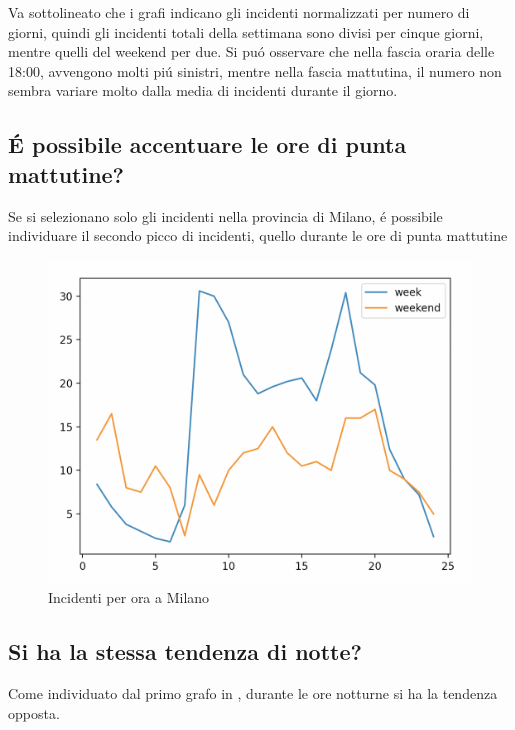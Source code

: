 \documentclass[a4paper]{report}
\begin{document}
Va sottolineato che i grafi indicano gli incidenti normalizzati per numero di 
giorni, 
quindi gli incidenti totali della settimana sono divisi per cinque giorni, 
mentre quelli del weekend per due.
Si pu\'o osservare che nella fascia oraria delle 18:00, 
avvengono molti pi\'u sinistri, mentre nella fascia mattutina, 
il numero non sembra variare molto dalla media di incidenti durante il giorno.

\clearpage
\subsection{\'E possibile accentuare le ore di punta mattutine?}

Se si selezionano solo gli incidenti nella provincia di Milano, \'e possibile individuare 
il secondo picco di incidenti, quello durante le ore di punta mattutine

\begin{figure}[!ht]
    \includegraphics[width=\linewidth]{../src/incidenti/incidenti_senza_coords/ore_punta/week_weekend_milano.png}
    \caption{Incidenti per ora a Milano}
    \label{fig:week_weekend_milano}
\end{figure}


\clearpage
\subsection{Si ha la stessa tendenza di notte?}

Come individuato dal primo grafo in \label{fig:week_weekend}, durante le 
ore notturne si ha la tendenza opposta.
\end{document}
